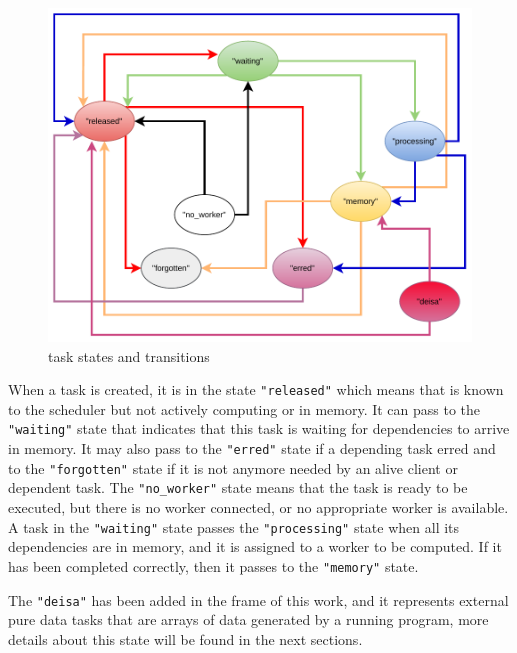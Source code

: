 \begin{figure}[tb]\centering
\includegraphics[scale=0.8]{figures/TaskStatesSheduler.pdf}
\caption{\dask task states and transitions }
\label{figdasktaskstate}
\end{figure}

When a task is created, it is in the state \texttt{"released"} which means that is known to the scheduler but not actively computing or in memory. It can pass to the \texttt{"waiting"} state that indicates that this task is waiting for dependencies to arrive in memory. It may also pass to the \texttt{"erred"} state if a depending task erred and to the \texttt{"forgotten"} state if it is not anymore needed by an alive client or dependent task. The \texttt{"no\_worker"} state means that the task is ready to be executed, but there is no worker connected, or no appropriate worker is available. 
A task in the \texttt{"waiting"} state passes the \texttt{"processing"} state when all its dependencies are in memory, and it is assigned to a worker to be computed. If it has been completed correctly, then it passes to the \texttt{"memory"} state. 

The \texttt{"deisa"} has been added in the frame of this work, and it represents external pure data tasks that are arrays of data generated by a running program, more details about this state will be found in the next sections. 

